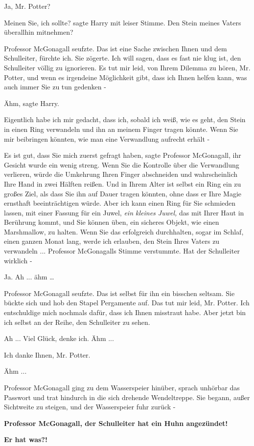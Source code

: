 \glqq{}Ja, Mr. Potter?\grqq{}

\glqq{}Meinen Sie, ich sollte?\grqq{} sagte Harry mit leiser Stimme. \glqq{}Den
Stein meines Vaters überallhin mitnehmen?\grqq{}

Professor McGonagall seufzte. \glqq{}Das ist eine Sache zwischen Ihnen und dem
Schulleiter, fürchte ich.\grqq{} Sie zögerte. \glqq{}Ich will sagen, dass es fast
nie klug ist, den Schulleiter völlig zu ignorieren. Es tut mir leid, von Ihrem
Dilemma zu hören, Mr. Potter, und wenn es irgendeine Möglichkeit gibt, dass ich
Ihnen helfen kann, was auch immer Sie zu tun gedenken -\grqq{}

\glqq{}Ähm\grqq{}, sagte Harry.

\glqq{}Eigentlich habe ich mir gedacht, dass ich, sobald ich weiß, wie es geht,
den Stein in einen Ring verwandeln und ihn an meinem Finger tragen könnte. Wenn
Sie mir beibringen könnten, wie man eine Verwandlung aufrecht erhält -\grqq{}

\glqq{}Es ist gut, dass Sie mich zuerst gefragt haben\grqq{}, sagte Professor
McGonagall, ihr Gesicht wurde ein wenig streng. \glqq{}Wenn Sie die Kontrolle
über die Verwandlung verlieren, würde die Umkehrung Ihren Finger abschneiden und
wahrscheinlich Ihre Hand in zwei Hälften reißen. Und in Ihrem Alter ist selbst
ein Ring ein zu großes Ziel, als dass Sie ihn auf Dauer tragen könnten, ohne
dass er Ihre Magie ernsthaft beeinträchtigen würde. Aber ich kann einen Ring für
Sie schmieden lassen, mit einer Fassung für ein Juwel, \emph{ein kleines Juwel,}
das mit Ihrer Haut in Berührung kommt, und Sie können üben, ein sicheres Objekt,
wie einen Marshmallow, zu halten. Wenn Sie das erfolgreich durchhalten, sogar im
Schlaf, einen ganzen Monat lang, werde ich erlauben, den Stein Ihres Vaters zu
verwandeln ...\grqq{} Professor McGonagalls Stimme verstummte. \glqq{}Hat der
Schulleiter wirklich -\grqq{}

\glqq{}Ja. Ah ... ähm …\grqq{}

Professor McGonagall seufzte. \glqq{}Das ist selbst für ihn ein bisschen
seltsam.\grqq{} Sie bückte sich und hob den Stapel Pergamente auf. \glqq{}Das tut
mir leid, Mr. Potter. Ich entschuldige mich nochmals dafür, dass ich Ihnen
misstraut habe. Aber jetzt bin ich selbst an der Reihe, den Schulleiter zu
sehen.\grqq{}

\glqq{}Ah ... Viel Glück, denke ich. Ähm ...\grqq{}

\glqq{}Ich danke Ihnen, Mr. Potter.\grqq{}

\glqq{}Ähm ...\grqq{}

Professor McGonagall ging zu dem Wasserspeier hinüber, sprach unhörbar das
Passwort und trat hindurch in die sich drehende Wendeltreppe. Sie begann, außer
Sichtweite zu steigen, und der Wasserspeier fuhr zurück -

\textbf{\glqq{}Professor McGonagall, der Schulleiter hat ein Huhn
angezündet!\grqq{}}

\textbf{\glqq{}Er hat was?!\grqq{}}